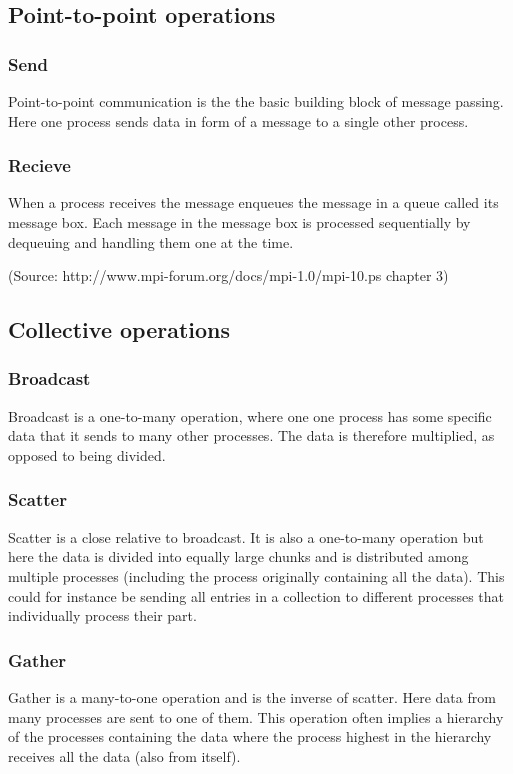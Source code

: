 \subsection{Point-to-point operations}
\subsubsection{Send}
Point-to-point communication is the the basic building block of message passing. Here one process sends data in form of a message to a single other process.
\subsubsection{Recieve}
When a process receives the message enqueues the message in a queue called its message box. Each message in the message box is processed sequentially by dequeuing and handling them one at the time.

(Source: http://www.mpi-forum.org/docs/mpi-1.0/mpi-10.ps chapter 3)

\subsection{Collective operations}
\subsubsection{Broadcast}
Broadcast is a one-to-many operation, where one one process has some specific data that it sends to many other processes. The data is therefore multiplied, as opposed to being divided.

\subsubsection{Scatter}
Scatter is a close relative to broadcast. It is also a one-to-many operation but here the data is divided into equally large chunks and is distributed among multiple processes (including the process originally containing all the data). This could for instance be sending all entries in a collection to different processes that individually process their part.

\subsubsection{Gather}
Gather is a many-to-one operation and is the inverse of scatter. Here data from many processes are sent to one of them. This operation often implies a hierarchy of the processes containing the data where the process highest in the hierarchy receives all the data (also from itself).

